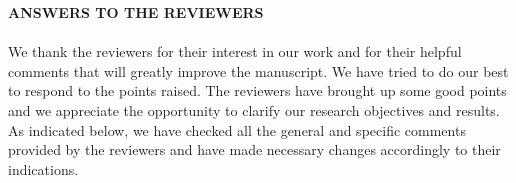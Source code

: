 \documentclass[10pt]{article}
\begin{document}
\noindent
{\Large\bf ANSWERS TO THE REVIEWERS}\\~\\

We thank the  reviewers for their interest in our work and for their helpful comments that will greatly improve  the manuscript. We have  tried  to do  our  best to  respond to  the  points  raised. The reviewers have brought  up  some  good  points  and  we  appreciate  the  opportunity  to  clarify  our research objectives and results. As  indicated  below,  we  have  checked  all  the  general  and  specific  comments  provided  by  the reviewers and have made necessary changes accordingly to their indications.\\

\\~\\
\end{document}
